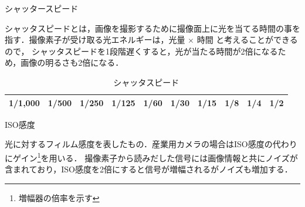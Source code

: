 \documentclass[8pt, jfont=ipaexm, t]{beamer} %
\begin{document}
\begin{frame}{シャッタースピード}
  \begin{block}{}
    シャッタスピードとは，画像を撮影するために撮像面上に光を当てる時間の事を指す．撮像素子が受け取る光エネルギーは，光量 $\times$ 時間 と考えることができるので，
    シャッタスピードを1段階遅くすると，光が当たる時間が2倍になるため，画像の明るさも2倍になる．
  \end{block}
  \begin{table}[h]
    \centering
    \caption{シャッタスピード}
    \begin{tabular}{|c|c|c|c|c|c|c|c|c|c|}
      \hline
      1/1,000 & 1/500 & 1/250 & 1/125 & 1/60 & 1/30 & 1/15 & 1/8 & 1/4 & 1/2 \\
      \hline
    \end{tabular}
  \end{table}
\end{frame}

\begin{frame}{ISO感度}
  \begin{block}{}
    光に対するフィルム感度を表したもの．産業用カメラの場合はISO感度の代わりにゲイン\footnote{増幅器の倍率を示す}を用いる．
    撮像素子から読みだした信号には画像情報と共にノイズが含まれており，ISO感度を2倍にすると信号が増幅されるがノイズも増加する．
  \end{block}
\end{frame}
\end{document}
